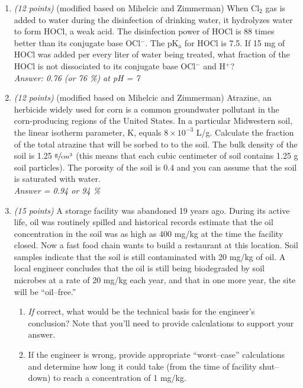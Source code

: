 \documentclass[12pt,letterpaper]{article}
\begin{document}
\begin{enumerate}
\item \emph{(12 points)} (modified based on Mihelcic and Zimmerman) When Cl$_2$ gas is added to water during the disinfection of drinking water, it hydrolyzes water to form HOCl, a weak acid. The disinfection power of HOCl is 88 times better than its conjugate base OCl$^-$.  The pK$\mathrm{_a}$ for HOCl is 7.5.  If 15 mg of HOCl was added per every liter of water being treated, what fraction of the HOCl is not dissociated to its conjugate base OCl$^-$ and H$^+$?\\\emph{ Answer: 0.76 (or 76 \%) at pH = 7}

\item \emph{(12 points)} (modified based on Mihelcic and Zimmerman) Atrazine, an herbicide widely used for corn is a common groundwater pollutant in the corn-producing regions of the United States.  In a particular Midwestern soil, the linear isotherm parameter, K, equals $8\times 10^{-3}$ L/g.  Calculate the fraction of the total atrazine that will be sorbed to to the soil.  The bulk density of the soil is 1.25 $\mathrm{\sfrac{g}{cm^3}}$ (this means that each cubic centimeter of soil contains 1.25 g soil particles).  The porosity of the soil is 0.4 and you can assume that the soil is saturated with water.\\\emph{Answer = 0.94 or 94 \%}

\item \emph{(15 points)} A storage facility was abandoned 19 years ago.  During its active life, oil was routinely spilled and historical records estimate that the oil concentration in the soil was as high as 400 mg/kg at the time the facility closed.  Now a fast food chain wants to build a restaurant at this location.  Soil samples indicate that the soil is still contaminated with 20 mg/kg of oil.  A local engineer concludes that the oil is still being biodegraded by soil microbes at a rate of 20 mg/kg each year, and that in one more year, the site will be ``oil--free.''

\begin{enumerate}
\item \emph{If} correct, what would be the technical basis for the engineer's conclusion? Note that you'll need to provide calculations to support your answer.
\item If the engineer is wrong, provide appropriate ``worst--case'' calculations and determine how long it could take (from the time of facility shut--down) to reach a concentration of 1 mg/kg.
\end{enumerate}


\end{enumerate}
\end{document}

